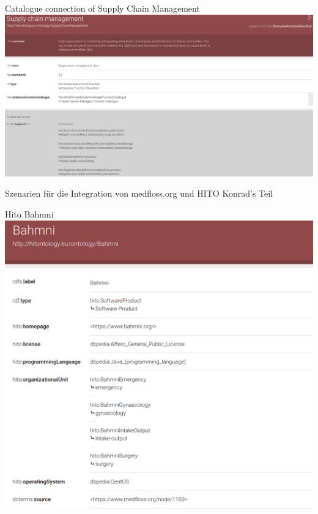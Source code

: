 \documentclass[aspectratio=1610,12pt]{beamer}
\begin{document}
\begin{frame}{Catalogue connection of Supply Chain Management}
  \includegraphics[width=\textwidth]{img/supplychainmanagement.png}
\end{frame}

\begin{frame}{Szenarien für die Integration von medfloss.org und HITO}
  \centering
  \huge Konrad's Teil
\end{frame}

\begin{frame}{Hito Bahmni}
  \includegraphics[width=\textwidth]{img/hito-bahmni.png}
\end{frame}
\end{document}
